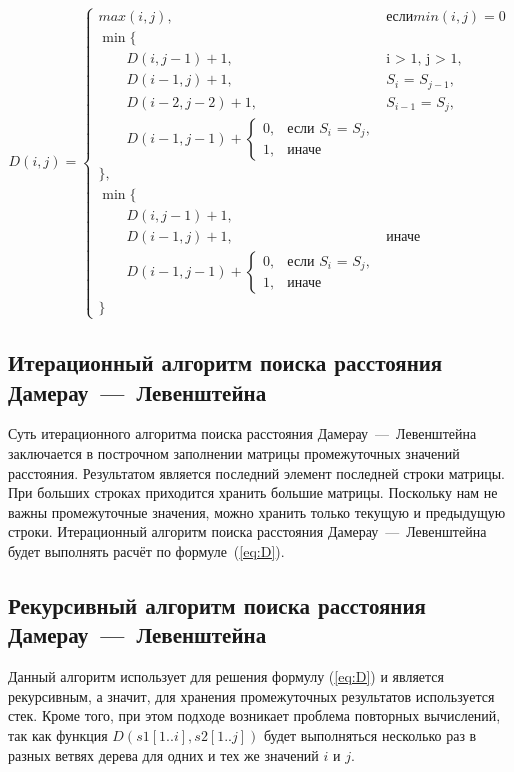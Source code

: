 \begin{equation}
	\label{eq:D}
	D(i, j) = \begin{cases}
		max(i, j), &если min(i, j) = 0\\

		\min \lbrace \\
		\qquad D(i, j-1) + 1,&\text{i > 1, j > 1,}\\
		\qquad D(i-1, j) + 1,&\text{$S_{i}$ = $S_{j-1}$,}\\
		\qquad D(i-2, j-2) + 1,&\text{$S_{i-1}$ = $S_{j}$,}\\
		\qquad D(i-1, j-1) + \begin{cases}
                        		0, &\text{если $S_{i}$ = $S_{j}$,}\\
                        		1, &\text{иначе}
                        	\end{cases}\\
		\rbrace,\\
		
		\min \lbrace \\
		\qquad D(i, j-1) + 1,\\
		\qquad D(i-1, j) + 1,&\text{иначе}\\
		\qquad D(i-1, j-1) + \begin{cases}
                        		0, &\text{если $S_{i}$ = $S_{j}$,}\\
                        		1, &\text{иначе}
                        	\end{cases}\\
		\rbrace
	\end{cases}
\end{equation}

\subsection{Итерационный алгоритм поиска расстояния Дамерау~---~Левенштейна}
Суть итерационного алгоритма поиска расстояния Дамерау~---~Левен\-штейна заключается в построчном заполнении матрицы промежуточных значений расстояния. Результатом является последний элемент последней строки матрицы. При больших строках приходится хранить большие матрицы. Поскольку нам не важны промежуточные значения, можно хранить только текущую и предыдущую строки. Итерационный алгоритм поиска расстояния Дамерау~---~Левенштейна будет выполнять расчёт по формуле~(\ref{eq:D}).

\subsection{Рекурсивный алгоритм поиска расстояния \\ \mbox{Дамерау~---~Левенштейна}}
Данный алгоритм использует для решения формулу (\ref{eq:D}) и является рекурсивным, а значит, для хранения промежуточных результатов используется стек. Кроме того, при этом подходе возникает проблема повторных вычислений, так как функция $D(s1[1..i], s2[1..j])$ будет выполняться несколько раз в разных ветвях дерева для одних и тех же значений $i$ и $j$.


